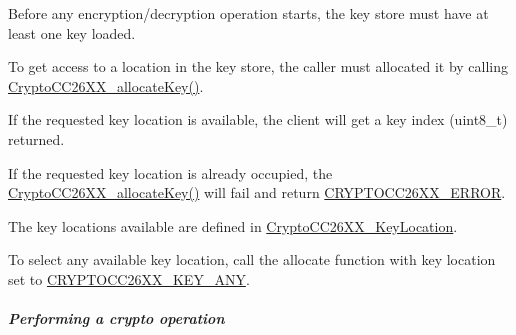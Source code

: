\begin{DoxyItemize}
\item Before any encryption/decryption operation starts, the key store must have at least one key loaded.
\item To get access to a location in the key store, the caller must allocated it by calling \hyperlink{_crypto_c_c26_x_x_8h_a50d5828043e87fd37398d2aabe9b9e92}{Crypto\-C\-C26\-X\-X\-\_\-allocate\-Key()}.
\item If the requested key location is available, the client will get a key index (uint8\-\_\-t) returned.
\item If the requested key location is already occupied, the \hyperlink{_crypto_c_c26_x_x_8h_a50d5828043e87fd37398d2aabe9b9e92}{Crypto\-C\-C26\-X\-X\-\_\-allocate\-Key()} will fail and return \hyperlink{_crypto_c_c26_x_x_8h_ae56a5165f1674a8a78b77c45ff7d7a5c}{C\-R\-Y\-P\-T\-O\-C\-C26\-X\-X\-\_\-\-E\-R\-R\-O\-R}.
\item The key locations available are defined in \hyperlink{_crypto_c_c26_x_x_8h_a4e214e5283d16ac67e593c7c8a5bc058}{Crypto\-C\-C26\-X\-X\-\_\-\-Key\-Location}.
\item To select any available key location, call the allocate function with key location set to \hyperlink{_crypto_c_c26_x_x_8h_a5266637af2c4ac36ed58d4e0f158b706a335a9c94549f0e882296bd43ccb4f953}{C\-R\-Y\-P\-T\-O\-C\-C26\-X\-X\-\_\-\-K\-E\-Y\-\_\-\-A\-N\-Y}.
\end{DoxyItemize}\subparagraph*{Performing a crypto operation}


